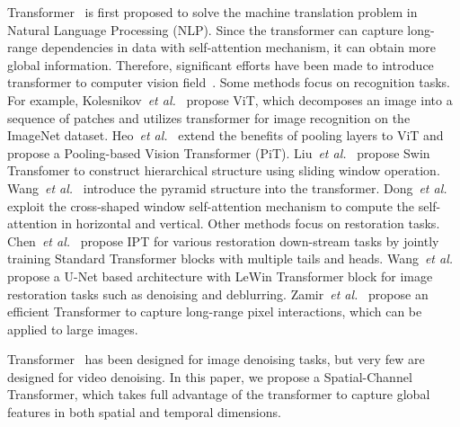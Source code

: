 \documentclass[journal]{IEEEtran}
\begin{document}
Transformer~\cite{vaswani2017attention} is first proposed to solve the machine translation problem in Natural Language Processing (NLP). Since the transformer can capture long-range dependencies in data with self-attention mechanism, it can obtain more global information. Therefore, significant efforts have been made to introduce transformer to computer vision field~\cite{ramachandran2019stand,touvron2021training,carion2020end,cao2021swin,9312201,8578951,10.1007/978-3-030-58452-8_13,9577298,kolesnikov2021image,9710580}. Some methods focus on recognition tasks. For example, Kolesnikov~\textit{et al.}~\cite{kolesnikov2021image} propose ViT, which decomposes an image into a sequence of patches and utilizes transformer for image recognition on the ImageNet dataset. Heo~\textit{et al.}~\cite{Heo2021RethinkingSD} extend the benefits of pooling layers to ViT and propose a Pooling-based Vision Transformer (PiT). Liu~\textit{et al.}~\cite{9710580} propose Swin Transfomer to construct hierarchical structure using sliding window operation. Wang~\textit{et al.}~\cite{9711179} introduce the pyramid structure into the transformer.
Dong~\textit{et al.}~\cite{Dong_2022_CVPR} exploit the cross-shaped window self-attention mechanism to compute the self-attention in horizontal and vertical. 
Other methods focus on restoration tasks. Chen~\textit{et al.}~\cite{Chen_2021_CVPR} propose IPT for various restoration down-stream tasks by jointly training Standard Transformer blocks with multiple tails and heads.
Wang~\textit{et al.}~\cite{Wang2022Uformer} propose a U-Net based architecture with LeWin Transformer block for image restoration tasks such as denoising and deblurring. Zamir~\textit{et al.}~\cite{Zamir_2022_CVPR} propose an efficient Transformer to capture long-range pixel interactions, which can be applied to large images.

Transformer~\cite{Chen_2021_CVPR, Wang2022Uformer,Zamir_2022_CVPR} has been designed for image denoising tasks, but very few are designed for video denoising. In this paper, we propose a Spatial-Channel Transformer, which takes full advantage of the transformer to capture global features in both spatial and temporal dimensions.
\end{document}
